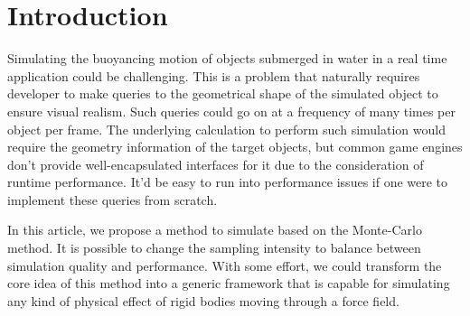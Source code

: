 \section{Introduction}

Simulating the buoyancing motion of objects submerged in water in a real time application could be challenging.
This is a problem that naturally requires developer to make queries to the geometrical shape of the simulated object to ensure visual realism.
Such queries could go on at a frequency of many times per object per frame.
The underlying calculation to perform such simulation would require the geometry information of the target objects, but common game engines don't provide well-encapsulated interfaces for it due to the consideration of runtime performance.
It'd be easy to run into performance issues if one were to implement these queries from scratch.

In this article, we propose a method to simulate based on the Monte-Carlo method.
It is possible to change the sampling intensity to balance between simulation quality and performance.
With some effort, we could transform the core idea of this method into a generic framework that is capable for simulating any kind of physical effect of rigid bodies moving through a force field.
